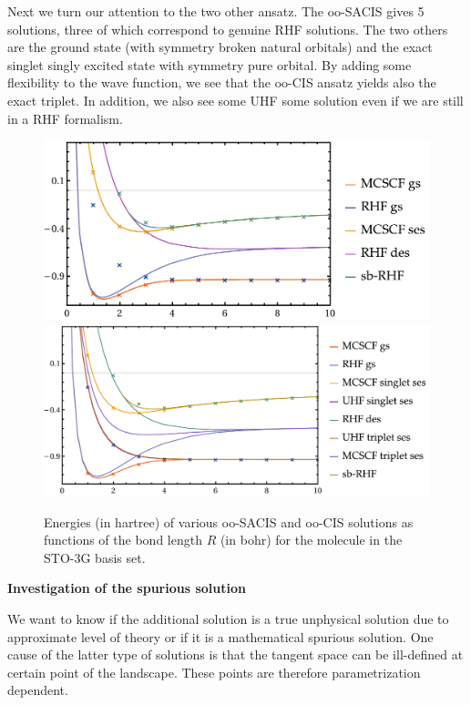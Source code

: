 \documentclass[11pt,a4paper]{article}
\begin{document}
Next we turn our attention to the two other ansatz. The oo-SACIS gives 5 solutions, three of which correspond to genuine RHF solutions. The two others are the ground state (with symmetry broken natural  orbitals) and the exact singlet singly excited state with symmetry pure orbital.
By adding some flexibility to the wave function, we see that the oo-CIS ansatz yields also the exact triplet. In addition, we also see some UHF some solution even if we are still in a RHF formalism.
\begin{figure}
  \centering
  \includegraphics[width=0.75\linewidth]{Figures/H2_ooSACIS_PES}
  \includegraphics[width=0.75\linewidth]{Figures/H2_ooCIS_PES}
  \caption{
    Energies (in hartree) of various oo-SACIS and oo-CIS solutions as functions of the bond length $R$ (in bohr) for the  molecule in the STO-3G basis set.
    \label{fig:H2ooCIS}}
\end{figure}

\textbf{Investigation of the spurious solution}

We want to know if the additional solution is a true unphysical solution due to approximate level of theory or if it is a mathematical spurious solution.
One cause of the latter type of solutions is that the tangent space can be ill-defined at certain point of the landscape. These points are therefore parametrization dependent.
\end{document}
